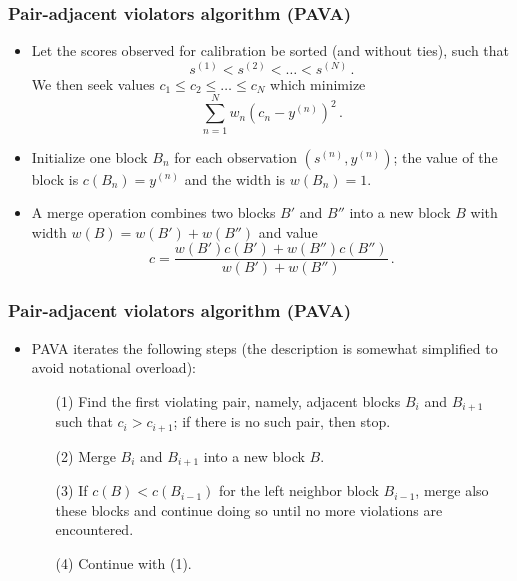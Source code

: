 \begin{frame}[t]
	\frametitle{Pair-adjacent violators algorithm (PAVA)}
	
	\begin{itemize}
		\item Let the scores observed for calibration be sorted (and without ties), such that
		$$
		s^{(1)} < s^{(2)} < \ldots < s^{(N)}\, .
		$$
		We then seek values $c_1 \leq c_2 \leq \ldots \leq c_N$ which minimize
		$$
		\sum_{n=1}^N w_n ( c_n - y^{(n)})^2 \, .
		$$
		\item Initialize one block $B_n$ for each observation $(s^{(n)} , y^{(n)})$; the value of the block is $c(B_n) = y^{(n)}$ and the width is $w(B_n) = 1$.
		
		\item A merge operation combines two blocks $B'$ and $B''$ into a new block $B$ with width $w(B) = w(B') + w(B'')$ and value
		$$
		c = \frac{w(B') c(B') + w(B'') c(B'')}{w(B') + w(B'')} \, .
		$$
		
		
	\end{itemize}
\end{frame}

\begin{frame}[t]
	\frametitle{Pair-adjacent violators algorithm (PAVA)}
	
	\begin{itemize}
		\item PAVA iterates the following steps (the description is somewhat simplified to avoid notational overload):
		
		\medskip
		
		\begin{itemize}
			\item[(1)] Find the first violating pair, namely, adjacent blocks $B_i$ and $B_{i+1}$ such that $c_i > c_{i+1}$; if there is no such pair, then stop.
			\item[(2)] Merge $B_i$ and $B_{i+1}$ into a new block $B$.
			\item[(3)] If $c(B) < c(B_{i-1})$ for the left neighbor block $B_{i-1}$, merge also these blocks and continue doing so until no more violations are encountered.
			\item[(4)] Continue with (1).
		\end{itemize}
	\end{itemize}
\end{frame}




